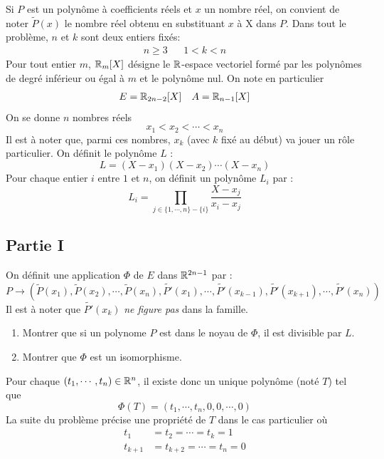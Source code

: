 Si $P$ est un polynôme à coefficients réels et $x$ un nombre réel, on convient de noter $\widetilde{P}(x)$ le nombre réel obtenu en substituant $x$ à X dans $P$.\newline
Dans tout le problème, $n$ et $k$ sont deux entiers fixés:
\begin{align*}
 n\geq 3 & & 1<k<n
\end{align*}
Pour tout entier $m$, $\mathbb{R}_{m}[X]$ désigne le $\mathbb{R}$-espace vectoriel formé par les polynômes de degré inférieur ou égal à $m$ et le polynôme nul. On note en particulier 
\begin{align*}
 E = \mathbb{R}_{2n-2}[X] & & A = \mathbb{R}_{n-1}[X]
\end{align*}
On se donne $n$ nombres réels 
\begin{displaymath}
 x_1 < x_2 < \cdots < x_n
\end{displaymath}
Il est à noter que, parmi ces nombres, $x_k$ (avec $k$ fixé au début) va jouer un rôle particulier.
On définit le polynôme $L$ :
\begin{displaymath}
 L = (X-x_1)(X-x_2)\cdots (X-x_n)
\end{displaymath}
Pour chaque entier $i$ entre $1$ et $n$, on définit un polynôme $L_i$  par :
\begin{displaymath}
L_i = \prod_{j\in\{1,\cdots,n\}-\{i\}}\frac{X-x_j}{x_i-x_j} 
\end{displaymath}

\subsection*{Partie I}
On définit une application $\Phi$  de $E$ dans $\mathbb{R}^{2n-1}$ par :
\begin{displaymath}
 P \rightarrow \left( \widetilde{P}(x_1),\widetilde{P}(x_2),\cdots,\widetilde{P}(x_n),
 \widetilde{P'}(x_1),\cdots ,\widetilde{P'}(x_{k-1}),\widetilde{P'}(x_{k+1}),\cdots,\widetilde{P'}(x_n)\right) 
\end{displaymath}
Il est à noter que $\widetilde{P'}(x_{k})$ \emph{ne figure pas} dans la famille.
\begin{enumerate}
\item Montrer que si un polynome $P$ est dans le noyau de $\Phi$, il est divisible par $L$.
\item Montrer que $\Phi$ est un isomorphisme.
\end{enumerate}


Pour chaque $(t_1,\cdots,t_n)\in \mathbb{R}^n$, il existe donc un unique polynôme (noté $T$) tel que 
\begin{displaymath}
 \Phi (T) = (t_1,\cdots,t_n,0,0,\cdots,0)
\end{displaymath}
La suite du problème précise une propriété de $T$ dans le cas particulier où
\begin{align*}
 t_1 &=t_2 =\cdots =t_k =1 \\
t_{k+1} &=t_{k+2} =\cdots =t_n =0 
\end{align*}

